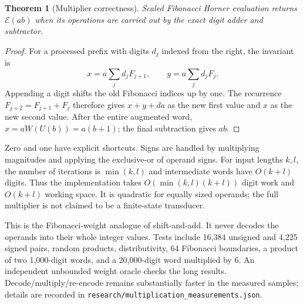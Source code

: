 \documentclass[11pt]{article}
\newtheorem{theorem}{Theorem}[section]
\theoremstyle{definition}\newtheorem{definition}[theorem]{Definition}
\newcommand{\E}{\mathcal E}
\begin{document}
\begin{theorem}[Multiplier correctness]
Scaled Fibonacci Horner evaluation returns $\E(ab)$ when its operations
are carried out by the exact digit adder and subtractor.
\end{theorem}
\begin{proof}
For a processed prefix with digits $d_j$ indexed from the right, the
invariant is
\[
x=a\sum_j d_jF_{j+1},\qquad y=a\sum_j d_jF_j.
\]
Appending a digit shifts the old Fibonacci indices up by one. The
recurrence $F_{j+2}=F_{j+1}+F_j$ therefore gives $x+y+da$ as the new
first value and $x$ as the new second value. After the entire augmented
word, $x=aW(U(b))=a(b+1)$; the final subtraction gives $ab$.
\end{proof}
Zero and one have explicit shortcuts. Signs are handled by multiplying
magnitudes and applying the exclusive-or of operand signs. For input
lengths $k,l$, the number of iterations is $\min(k,l)$ and intermediate
words have $O(k+l)$ digits. Thus the implementation takes
$O(\min(k,l)(k+l))$ digit work and $O(k+l)$ working space. It is quadratic
for equally sized operands; the full multiplier is not claimed to be a
finite-state transducer.

This is the Fibonacci-weight analogue of shift-and-add. It never decodes
the operands into their whole integer values. Tests include 16,384
unsigned and 4,225 signed pairs, random products, distributivity, 64
Fibonacci boundaries, a product of two 1,000-digit words, and a
20,000-digit word multiplied by 6. An independent unbounded weight oracle
checks the long results. Decode/multiply/re-encode remains substantially
faster in the measured samples; details are recorded in
\texttt{research/multiplication\_measurements.json}.
\end{document}
